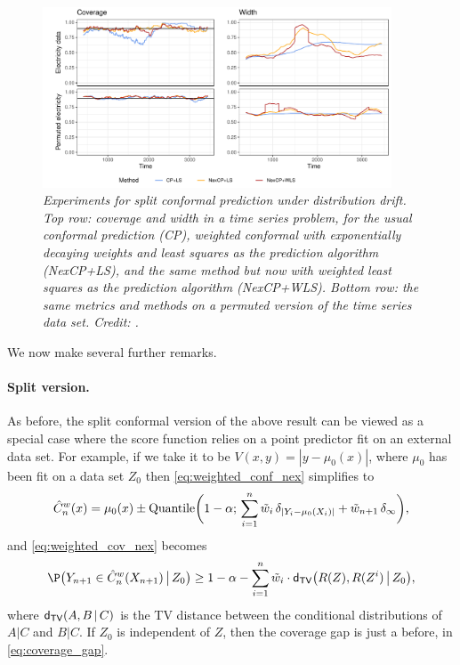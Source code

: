 \documentclass{article}
\begin{document}
\begin{figure}[htb]
\centering
\includegraphics[width=0.925\textwidth]{electricity.pdf}
\caption{\it Experiments for split conformal prediction under distribution
  drift. Top row: coverage and width in a time series problem, for the usual
  conformal prediction (CP), weighted conformal with exponentially decaying
  weights and least squares as the prediction algorithm (NexCP+LS), and the same
  method but now with weighted least squares as the prediction algorithm 
  (NexCP+WLS). Bottom row: the same metrics and methods on a permuted version of 
  the time series data set. Credit: \citet{barber2022conformal}.}        
\label{fig:electricity}
\end{figure}

We now make several further remarks. 

\paragraph{Split version.}

As before, the split conformal version of the above result can be viewed as a
special case where the score function relies on a point predictor fit on an
external data set. For example, if we take it to be $V(x,y) = |y-\mu_0(x)|$,
where $\mu_0$ has been fit on a data set $Z_0$ then \eqref{eq:weighted_conf_nex}
simplifies to            
\[
\hat{C}^w_n(x) = \mu_0(x) \pm \mathrm{Quantile}\bigg(1-\alpha; \, \sum_{i=1}^n \tilde{w}_i \,
\delta_{|Y_i - \mu_0(X_i)|} + \tilde{w}_{n+1} \, \delta_\infty \bigg),
\]
and \eqref{eq:weighted_cov_nex} becomes
\[
\P\big( Y_{n+1} \in \hC^w_n(X_{n+1}) \,\big|\, Z_0 \big) \geq 1-\alpha -
\sum_{i=1}^n \tw_i \cdot \dtv\big( R(Z), R(Z^i) \,\big|\, Z_0 \big), 
\]
where $\mathsf{d}_{\mathsf{TV}}(A, B \,|\, C)$ is the TV distance between the conditional
distributions of $A|C$ and $B|C$. If $Z_0$ is independent of $Z$, then the
coverage gap is just a before, in \eqref{eq:coverage_gap}.
\end{document}
